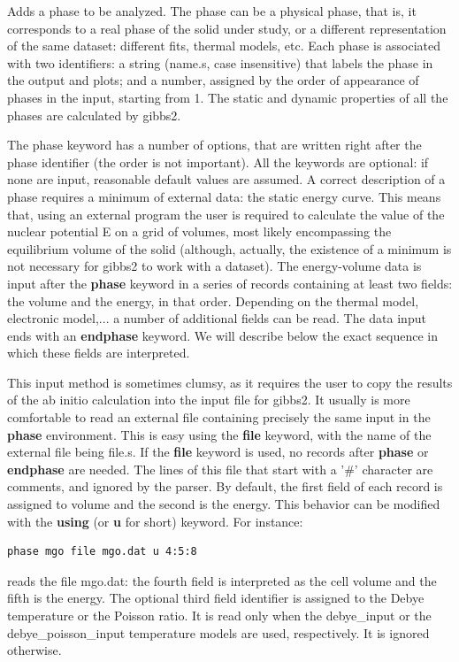 \documentclass[a4paper]{article}
\begin{document}
Adds a phase to be analyzed. The phase can be a physical phase, that
is, it corresponds to a real phase of the solid under study, or a
different representation of the same dataset: different fits, thermal
models, etc. Each phase is associated with two identifiers: a string
(name.s, case insensitive) that labels the phase in the output and
plots; and a number, assigned by the order of appearance of phases in
the input, starting from 1. The static and dynamic properties of all
the phases are calculated by gibbs2.

The phase keyword has a number of options, that are written right
after the phase identifier (the order is not important). All the
keywords are optional: if none are input, reasonable default values
are assumed. A correct description of a phase requires a minimum of
external data: the static energy curve. This means that, using an
external program the user is required to calculate the value of the
nuclear potential E on a grid of volumes, most likely encompassing the
equilibrium volume of the solid (although, actually, the existence of
a minimum is not necessary for gibbs2 to work with a dataset). The
energy-volume data is input after the \textbf{phase} keyword in a series of
records containing at least two fields: the volume and the energy, in
that order. Depending on the thermal model, electronic model,... a
number of additional fields can be read. The data input ends with an
\textbf{endphase} keyword. We will describe below the exact sequence in
which these fields are interpreted.

This input method is sometimes clumsy, as it requires the user to copy
the results of the ab initio calculation into the input file for
gibbs2. It usually is more comfortable to read an external file
containing precisely the same input in the \textbf{phase} environment. This
is easy using the \textbf{file} keyword, with the name of the external file
being file.s. If the \textbf{file} keyword is used, no records after
\textbf{phase} or \textbf{endphase} are needed. The lines of this file that
start with a '\#' character are comments, and ignored by the
parser. By default, the first field of each record is assigned to
volume and the second is the energy. This behavior can be modified
with the \textbf{using} (or \textbf{u} for short) keyword. For instance:
%
\gibbslist
\begin{lstlisting}
phase mgo file mgo.dat u 4:5:8
\end{lstlisting}

reads the file mgo.dat: the fourth field is interpreted as the cell
volume and the fifth is the energy. The optional third field
identifier is assigned to the Debye temperature or the Poisson
ratio. It is read only when the debye\_input or the debye\_poisson\_input
temperature models are used, respectively. It is ignored otherwise.
\end{document}
